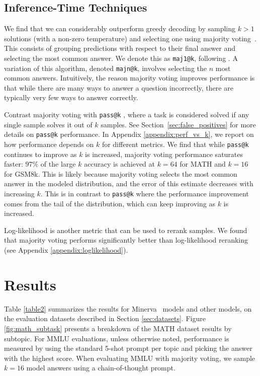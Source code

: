 \subsection{Inference-Time Techniques}
\label{sec:advanced_inference}

We find that we can considerably outperform greedy decoding by sampling $k>1$ solutions (with a non-zero temperature) and selecting one using majority voting~\cite{majority_voting}. This consists of grouping predictions with respect to their final answer and selecting the most common answer. We denote this as \texttt{maj1@k}, following \cite{alphacode}. A variation of this algorithm, denoted \texttt{majn@k}, involves selecting the $n$ most common answers. Intuitively, the reason majority voting improves performance is that while there are many ways to answer a question incorrectly, there are typically very few ways to answer correctly.

Contrast majority voting with {\texttt{pass@k} }\!, where a task is considered solved if any single sample solves it out of $k$ samples. See Section~\ref{sec:false_positives} for more details on {\texttt{pass@k} } performance. In Appendix \ref{appendix:perf_vs_k},
we report on how performance depends on $k$ for different metrics. We find that while {\texttt{pass@k} } continues to improve as $k$ is increased, majority voting performance saturates faster: $97\%$ of the large $k$ accuracy is achieved at $k=64$ for MATH and $k=16$ for GSM8k. This is likely because majority voting selects the most common answer in the modeled distribution, and the error of this estimate decreases with increasing $k$. This is in contrast to {\texttt{pass@k} } where the performance improvement comes from the tail of the distribution, which can keep improving as $k$ is increased.

Log-likelihood is another metric that can be used to rerank samples. We found that majority voting performs significantly better than log-likelihood reranking (see Appendix \ref{appendix:loglikelihood}).

\newcommand{\lowk}[1]{$\vert_{\tiny{k=#1}}$}
\newcommand{\bfseries}{\bfseries}

\section{Results}
\label{sec:results}

Table \ref{table2} summarizes the results for {Minerva~} models and other models, on the evaluation datasets described in Section \ref{sec:datasets}.
Figure \ref{fig:math_subtask} presents a breakdown of the MATH dataset results by subtopic. For MMLU evaluations, unless otherwise noted, performance is measured by using the standard 5-shot prompt per topic and picking the answer with the highest score. When evaluating MMLU with majority voting, we sample $k=16$ model answers using a chain-of-thought prompt.

